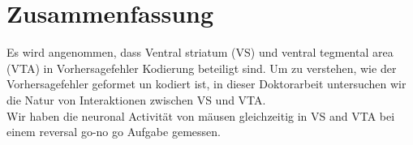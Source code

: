 \chapter*{Zusammenfassung}
Es wird angenommen, dass Ventral striatum (VS) und ventral tegmental area (VTA) in Vorhersagefehler Kodierung beteiligt sind. Um zu verstehen, wie der Vorhersagefehler geformet un kodiert ist, in dieser Doktorarbeit untersuchen wir die Natur von Interaktionen zwischen VS und VTA.\\
Wir haben die neuronal Activität von mäusen gleichzeitig in VS and VTA bei einem reversal go-no go Aufgabe gemessen.